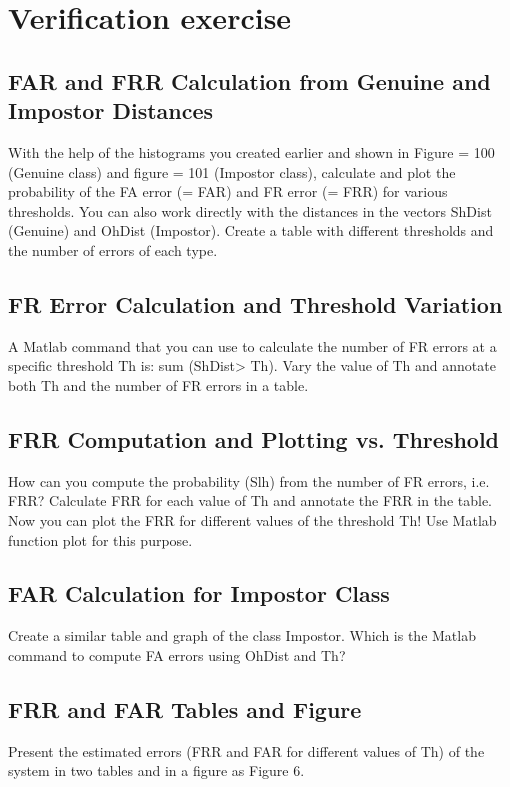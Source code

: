 \documentclass[a4paper,12pt]{article}
\begin{document}
\section{Verification exercise}

\subsection{FAR and FRR Calculation from Genuine and Impostor Distances}
With the help of the histograms you created earlier and shown in Figure = 100 (Genuine class) and figure = 101 (Impostor class), calculate and plot the probability of the FA error (= FAR) and FR error (= FRR) for various thresholds. You can also work directly with the distances in the vectors ShDist (Genuine) and OhDist (Impostor). Create a table with different thresholds and the number of errors of each type.

\subsection{FR Error Calculation and Threshold Variation}
A Matlab command that you can use to calculate the number of FR errors at a specific threshold Th is: sum (ShDist> Th). Vary the value of Th and annotate both Th and the number of FR errors in a table.


\subsection{FRR Computation and Plotting vs. Threshold}
How can you compute the probability (Slh) from the number of FR errors, i.e. FRR? Calculate FRR for each value of Th and annotate the FRR in the table. Now you can plot the FRR for different values of the threshold Th! Use Matlab function plot for this purpose.

\subsection{FAR Calculation for Impostor Class}
Create a similar table and graph of the class Impostor. Which is the Matlab command to compute FA errors using OhDist and Th?


\subsection{FRR and FAR Tables and Figure}
Present the estimated errors (FRR and FAR for different values of Th) of the system in two tables and in a figure as Figure 6.
\end{document}
